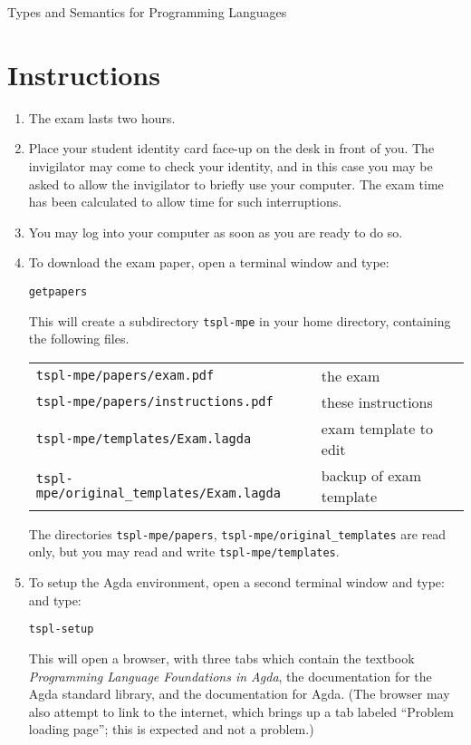 \documentclass[12pt]{article}
\begin{document}
\pagestyle{empty}
\setcounter{page}{1}

\begin{center}
\large Types and Semantics for Programming Languages
\end{center}

\section*{Instructions}

\begin{enumerate}

\item
  The exam lasts two hours.

\item
  Place your student identity card face-up on the desk in front of you.  The
  invigilator may come to check your identity, and in this case you may be asked
  to allow the invigilator to briefly use your computer.  The exam time has been
  calculated to allow time for such interruptions.

\item
  You may log into your computer as soon as you are ready to do so.

\item
  To download the exam paper, open a terminal window and type:
  \begin{center}
    \texttt{getpapers}
  \end{center}
  This will create a subdirectory \texttt{tspl-mpe} in your home directory,
  containing the following files.
  \begin{center}
    \begin{tabular}{ll}
      \texttt{tspl-mpe/papers/exam.pdf}                & the exam \\
      \texttt{tspl-mpe/papers/instructions.pdf}        & these instructions \\
      \texttt{tspl-mpe/templates/Exam.lagda}           & exam template to edit \\
      \texttt{tspl-mpe/original\_templates/Exam.lagda} & backup of exam template
    \end{tabular}
  \end{center}
  The directories \texttt{tspl-mpe/papers}, \texttt{tspl-mpe/original\_templates}
  are read only, but you may read and write \texttt{tspl-mpe/templates}.

\item
  To setup the Agda environment, open a second terminal window and type:
  and type:
  \begin{center}
    \texttt{tspl-setup}
  \end{center}
  This will open a browser, with three tabs which contain the textbook
  \emph{Programming Language Foundations in Agda}, the documentation for the
  Agda standard library, and the documentation for Agda.  (The browser may
  also attempt to link to the internet, which brings up a tab labeled
  ``Problem loading page''; this is expected and not a problem.)


\end{enumerate}
\end{document}
